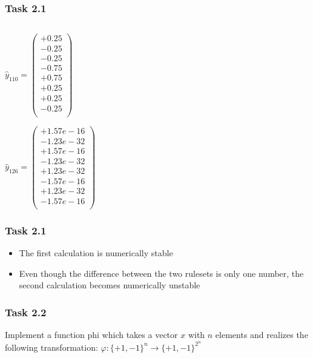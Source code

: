 \documentclass[10pt,aspectratio=169,handout]{beamer}
\begin{document}
\begin{frame}
    \frametitle{Task 2.1}
    \inputminted[bgcolor=LightGray,fontsize=\small]{python}{calcyhat.py}
    \begin{minipage}{0.45\textwidth}
        $\hat{y}_{110}= \begin{pmatrix}
                +0.25 \\
                -0.25 \\
                -0.25 \\
                -0.75 \\
                +0.75 \\
                +0.25 \\
                +0.25 \\
                -0.25 \\
            \end{pmatrix}$
    \end{minipage}
    \begin{minipage}{0.45\textwidth}
        $\hat{y}_{126}= \begin{pmatrix}
                +1.57e-16 \\
                -1.23e-32 \\
                +1.57e-16 \\
                -1.23e-32 \\
                +1.23e-32 \\
                -1.57e-16 \\
                +1.23e-32 \\
                -1.57e-16 \\
            \end{pmatrix}$
    \end{minipage}
\end{frame}

\begin{frame}
    \frametitle{Task 2.1}
    \begin{itemize}
        \item The first calculation is numerically stable
        \item Even though the difference between the two rulesets is only one number, the second calculation becomes numerically unstable
    \end{itemize}
\end{frame}

\begin{frame}
    \frametitle{Task 2.2}
    Implement a function phi which takes a vector $x$ with $n$ elements and realizes the following transformation:
    $\varphi : \{+1, -1\}^n \to \{+1, -1\}^{2^n} $
    \inputminted[bgcolor=LightGray,fontsize=\small]{python}{phi.py}
\end{frame}
\end{document}
